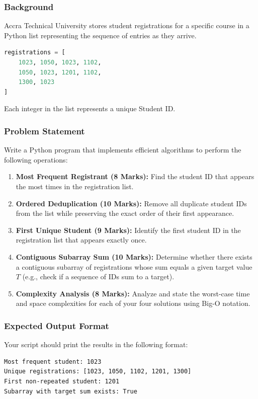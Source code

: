 \documentclass[11pt,a4paper]{article}
\begin{document}
\subsubsection*{Background}
Accra Technical University stores student registrations for a specific course in a Python list representing the sequence of entries as they arrive.
\begin{lstlisting}[language=Python]
registrations = [
    1023, 1050, 1023, 1102,
    1050, 1023, 1201, 1102,
    1300, 1023
]
\end{lstlisting}
Each integer in the list represents a unique Student ID.

\subsubsection*{Problem Statement}
Write a Python program that implements efficient algorithms to perform the following operations:
\begin{enumerate}
    \item \textbf{Most Frequent Registrant (8 Marks):} Find the student ID that appears the most times in the registration list.
    \item \textbf{Ordered Deduplication (10 Marks):} Remove all duplicate student IDs from the list while preserving the exact order of their first appearance.
    \item \textbf{First Unique Student (9 Marks):} Identify the first student ID in the registration list that appears exactly once.
    \item \textbf{Contiguous Subarray Sum (10 Marks):} Determine whether there exists a contiguous subarray of registrations whose sum equals a given target value $T$ (e.g., check if a sequence of IDs sum to a target).
    \item \textbf{Complexity Analysis (8 Marks):} Analyze and state the worst-case time and space complexities for each of your four solutions using Big-O notation.
\end{enumerate}

\subsubsection*{Expected Output Format}
Your script should print the results in the following format:
\begin{lstlisting}[backgroundcolor=\color{black!5!white}]
Most frequent student: 1023
Unique registrations: [1023, 1050, 1102, 1201, 1300]
First non-repeated student: 1201
Subarray with target sum exists: True
\end{lstlisting}
\end{document}

